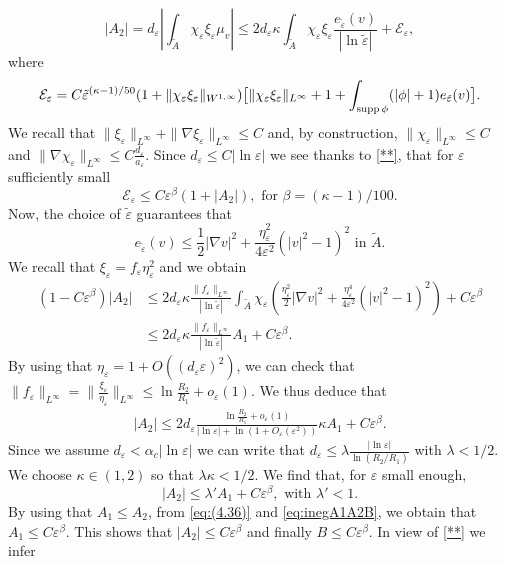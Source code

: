 \documentclass[12pt,reqno]{amsart}
\def\A{{\tilde{A}}}
\def\e {{\varepsilon}}
\def\supp{{\rm supp\,}}
\numberwithin{equation}{section}
\begin{document}
\begin{equation*}
|A_2|=d_\e\left|\int_{\A} \chi_\e \xi_\e \mu_v  \right|\leq 2d_\e \kappa \int_{\A}\chi_\e \xi_\e \frac{e_{\tilde{\e}}(v)}{|\ln \tilde{\e}|}+\mathcal{E}_\e,
\end{equation*}
where
\begin{equation*}
\mathcal{E}_\e=C\tilde{\e}^{(\kappa-1)/50}(1+\|\chi_\e \xi_\e\|_{W^{1,\infty}})\bigl[\|\chi_\e\xi_\e\|_{L^\infty}+1+\int_{\supp \phi}(|\phi|+1)e_{\tilde{\e}}(v)\bigr].
\end{equation*}
We recall that \(\|\xi_\e\|_{L^\infty}+\|\nabla \xi_\e\|_{L^\infty}\leq C\) and, by construction, \(\|\chi_\e\|_{L^\infty}\leq C\) and \(\|\nabla \chi_\e\|_{L^\infty}\leq C\frac{d_\e}{a_\e}\). Since \(d_\e \leq C |\ln \e|\) we see  thanks to \eqref{**}, that  for \(\e\) sufficiently small
\begin{equation*}
\mathcal{E}_\e \leq C \e^\beta (1+|A_2|), \text{ for } \beta=(\kappa-1)/100.
\end{equation*}
Now, the choice of \(\tilde{\e}\) guarantees that 
\begin{equation*}
e_{\tilde{\e}}(v)\leq \frac12 |\nabla v|^2+\frac{\eta_\e^2}{4\e^2}(|v|^2-1)^2 \text{ in } \A.
\end{equation*}
We recall that \(\xi_\e=f_\e\eta_\e^2\) and we obtain
\begin{align*}
(1-C\e^\beta)|A_2| & \leq 2 d_\e\kappa \frac{\|f_\e\|_{L^\infty}}{|\ln \tilde{\e}|}\int_{\A} \chi_\e \left(\frac{\eta_\e^2}{2}|\nabla v|^2+\frac{\eta_\e^4}{4\e^2}(|v|^2-1)^2 \right)+C\e^\beta \\
& \leq 2d_\e \kappa \frac{\|f_\e\|_{L^\infty}}{|\ln \tilde{\e}|}A_1 +C\e^\beta.
\end{align*}
By using that \(\eta_\e=1+O((d_\e\e)^2)\), we can check that \(\|f_\e\|_{L^\infty}=\|\frac{\xi_\e}{\eta_\e}\|_{L^\infty}\leq \ln \frac{R_2}{R_1}+o_\e(1)\). We thus deduce that 
\begin{align*}
|A_2|\leq 2d_\e \frac{\ln \frac{R_2}{R_1}+o_\e(1)}{|\ln \e|+\ln (1+O_\e(\e^2))}\kappa A_1+C\e^\beta.
\end{align*}
Since we assume \(d_\e <\alpha_c |\ln \e|\) we can write that \(d_\e \leq \lambda \frac{|\ln \e|}{\ln (R_2/R_1)}\) with \(\lambda<1/2\). We choose \(\kappa\in (1,2)\) so that \(\lambda \kappa<1/2\). We find that, for \(\e\) small enough,
\begin{equation*}
|A_2|\leq \lambda'A_1+C\e^{\beta}, \text{ with } \lambda'<1.
\end{equation*}
By using that \(A_1\leq A_2\), from \eqref{eq:(4.36)} and \eqref{eq:inegA1A2B}, we obtain that \(A_1\leq C\e^{\beta}\). This shows that \(|A_2|\leq C\e^{\beta}\) and finally \(B\leq C\e^\beta\). In view of \eqref{**} we infer
\end{document}
